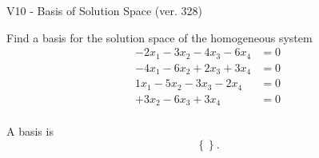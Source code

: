 \begin{exercise}
  \begin{exerciseTitle}V10 - Basis of Solution Space (ver. 328)\end{exerciseTitle}
  \begin{exerciseStatement}
    Find a basis for the solution space of the homogeneous system 
\begin{align*}
 -2 x_ 1 -3 x_ 2 -4 x_ 3 -6 x_ 4 &= 0  \\ 
  -4 x_ 1 -6 x_ 2 + 2 x_ 3 + 3 x_ 4 &= 0  \\ 
  1 x_ 1 -5 x_ 2 -3 x_ 3 -2 x_ 4 &= 0  \\ 
  + 3 x_ 2 -6 x_ 3 + 3 x_ 4 &= 0  \\ 
 \end{align*}


 
  \end{exerciseStatement}

  \begin{exerciseAnswer}
   A basis is   
\[\left\{\right\}.\]

  


  \end{exerciseAnswer}
\end{exercise}